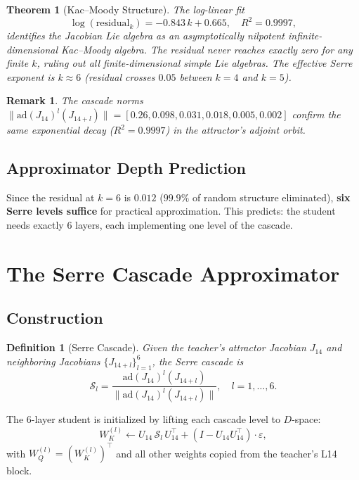 \documentclass[11pt,a4paper]{article}
\newtheorem{theorem}{Theorem}
\newtheorem{definition}{Definition}
\newtheorem{remark}{Remark}
\begin{document}
\begin{theorem}[Kac--Moody Structure]
The log-linear fit
\[
\log(\text{residual}_k) = -0.843\,k + 0.665, \quad R^2 = 0.9997,
\]
identifies the Jacobian Lie algebra as an \emph{asymptotically nilpotent
infinite-dimensional Kac--Moody algebra}.  The residual never reaches
exactly zero for any finite $k$, ruling out all finite-dimensional simple
Lie algebras.  The effective Serre exponent is $k \approx 6$ (residual
crosses $0.05$ between $k=4$ and $k=5$).
\end{theorem}

\begin{remark}
The cascade norms $\|\text{ad}(J_{14})^l(J_{14+l})\| = [0.26, 0.098, 0.031, 0.018, 0.005, 0.002]$
confirm the same exponential decay ($R^2 = 0.9997$) in the attractor's
adjoint orbit.
\end{remark}

\subsection{Approximator Depth Prediction}

Since the residual at $k=6$ is $0.012$ ($99.9\%$ of random structure eliminated),
\textbf{six Serre levels suffice} for practical approximation.  This predicts:
the student needs exactly 6 layers, each implementing one level of the cascade.

\section{The Serre Cascade Approximator}
\label{sec:approximator}

\subsection{Construction}

\begin{definition}[Serre Cascade]
Given the teacher's attractor Jacobian $J_{14}$ and neighboring Jacobians
$\{J_{14+l}\}_{l=1}^6$, the \emph{Serre cascade} is
\[
\mathcal{S}_l = \frac{\text{ad}(J_{14})^l(J_{14+l})}
                     {\|\text{ad}(J_{14})^l(J_{14+l})\|}, \quad l = 1,\ldots,6.
\]
\end{definition}

The 6-layer student is initialized by lifting each cascade level to $D$-space:
\[
W_K^{(l)} \leftarrow U_{14}\,\mathcal{S}_l\,U_{14}^\top + (I - U_{14}U_{14}^\top)\cdot\varepsilon,
\]
with $W_Q^{(l)} = (W_K^{(l)})^\top$ and all other weights copied from the
teacher's L14 block.
\end{document}
